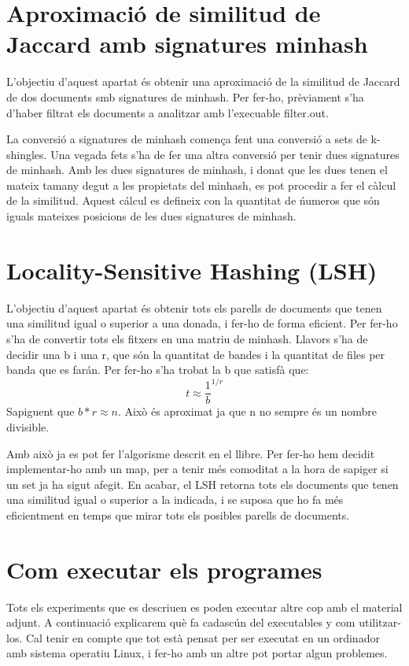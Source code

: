 \documentclass[a4paper, titlepage, 12pt]{report}
\begin{document}
\section{Aproximació de similitud de Jaccard amb signatures minhash}
L'objectiu d'aquest apartat és obtenir una aproximació de la similitud de Jaccard de dos documents smb signatures de minhash. Per fer-ho, prèviament s'ha d'haber filtrat els documents a analitzar amb l'execuable filter.out.

La conversió a signatures de minhash comença fent una conversió a sets de k-shingles. Una vegada fets s'ha de fer una altra conversió per tenir dues signatures de minhash. Amb les dues signatures de minhash, i donat que les dues tenen el mateix tamany degut a les propietats del minhash, es pot procedir a fer el càlcul de la similitud. Aquest cálcul es defineix con la quantitat de ńumeros que són iguals mateixes posicions de les dues signatures de minhash.

\section{Locality-Sensitive Hashing (LSH)}
L'objectiu d'aquest apartat és obtenir tots els parells de documents que tenen una similitud igual o superior a una donada, i fer-ho de forma eficient. Per fer-ho s'ha de convertir tots els fitxers en una matriu de minhash. Llavors s'ha de decidir una b i una r, que són la quantitat de bandes i la quantitat de files per banda que es farán. Per fer-ho s'ha trobat la b que satisfà que:
\begin{equation}
 t \approx {\frac{1}{b}}^{1/r}
\end{equation}
Sapiguent que $b*r \approx n$. Això és aproximat ja que n no sempre és un nombre divisible.

Amb això ja es pot fer l'algorisme descrit en el llibre. Per fer-ho hem decidit implementar-ho amb un map, per a tenir més comoditat a la hora de sapiger si un set ja ha sigut afegit. En acabar, el LSH retorna tots els documents que tenen una similitud igual o superior a la indicada, i se suposa que ho fa més eficientment en temps que mirar tots els posibles parells de documents.



\section{Com executar els programes}
Tots els experiments que es descriuen es poden executar altre cop amb el material adjunt. A continuació explicarem què fa cadascún del executables y com utilitzar-los. Cal tenir en compte que tot està pensat per ser executat en un ordinador amb sistema operatiu Linux, i fer-ho amb un altre pot portar algun problemes.
\end{document}
